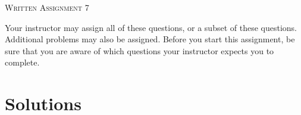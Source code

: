 \documentclass{article}
\title{}
\date{}
\begin{document}
\begin{center}
\textsc{\LARGE Written Assignment 7}\\[0.5cm]
\end{center}
Your instructor may assign all of these questions, or a subset of these questions. Additional problems may also be assigned. Before you start this assignment, be sure that you are aware of which questions your instructor expects you to complete.


\newpage
\section*{Solutions}
\end{document}
